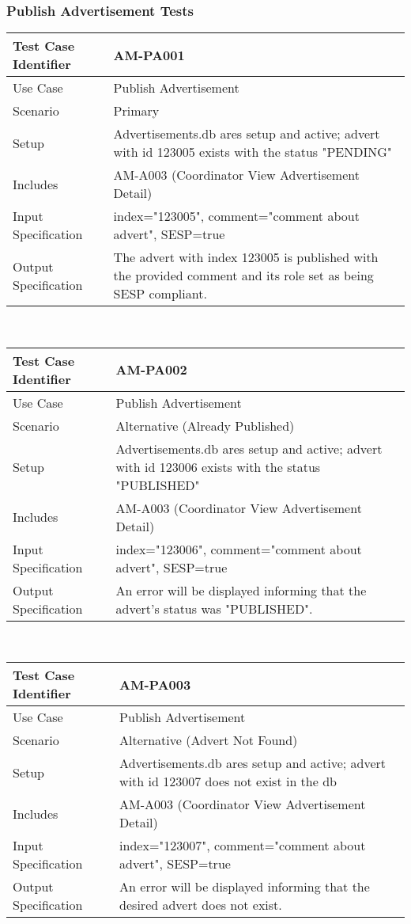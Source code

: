 \documentclass{l3deliverable}
\begin{document}
\subsubsection{Publish Advertisement Tests}
\begin{tabular}{lp{10cm}}
\hline 
\textbf{Test Case Identifier} & AM-PA001\tabularnewline
\hline 
\hline 
Use Case & Publish Advertisement \tabularnewline
\hline 
Scenario & Primary \tabularnewline
\hline 
Setup & Advertisements.db ares setup and active; advert with id 123005 exists with the status "PENDING"\tabularnewline
\hline 
Includes & AM-A003 (Coordinator View Advertisement Detail)\tabularnewline
\hline 
Input Specification & index="123005", comment="comment about advert", SESP=true \tabularnewline
\hline 
Output Specification &The advert with index 123005 is published with the provided comment and its role set as being SESP compliant.\tabularnewline
\hline 
\end{tabular}\\

\begin{tabular}{lp{10cm}}
\hline 
\textbf{Test Case Identifier} & AM-PA002\tabularnewline
\hline 
\hline 
Use Case & Publish Advertisement \tabularnewline
\hline 
Scenario & Alternative (Already Published) \tabularnewline
\hline 
Setup & Advertisements.db ares setup and active; advert with id 123006 exists with the status "PUBLISHED"\tabularnewline
\hline 
Includes & AM-A003 (Coordinator View Advertisement Detail)\tabularnewline
\hline 
Input Specification & index="123006", comment="comment about advert", SESP=true \tabularnewline
\hline 
Output Specification & An error will be displayed informing that the advert's status was "PUBLISHED".\tabularnewline
\hline 
\end{tabular}\\


\begin{tabular}{lp{10cm}}
\hline 
\textbf{Test Case Identifier} & AM-PA003\tabularnewline
\hline 
\hline 
Use Case & Publish Advertisement \tabularnewline
\hline 
Scenario & Alternative (Advert Not Found) \tabularnewline
\hline 
Setup & Advertisements.db ares setup and active; advert with id 123007 does not exist in the db\tabularnewline
\hline 
Includes & AM-A003 (Coordinator View Advertisement Detail)\tabularnewline
\hline 
Input Specification & index="123007", comment="comment about advert", SESP=true \tabularnewline
\hline 
Output Specification & An error will be displayed informing that the desired advert does not exist.\tabularnewline
\hline 
\end{tabular}\\
\end{document}

